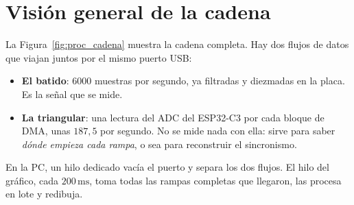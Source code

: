 \section{Visión general de la cadena}
\label{sec:proc_vision}

La Figura~\ref{fig:proc_cadena} muestra la cadena completa. Hay dos flujos
de datos que viajan juntos por el mismo puerto USB:

\begin{itemize}
  \item \textbf{El batido}: $6000$ muestras por segundo, ya filtradas y
    diezmadas en la placa. Es la señal que se mide.
  \item \textbf{La triangular}: una lectura del ADC del ESP32-C3 por cada
    bloque de DMA, unas $187{,}5$ por segundo. No se mide nada con ella:
    sirve para saber \emph{dónde empieza cada rampa}, o sea para reconstruir
    el sincronismo.
\end{itemize}

En la PC, un hilo dedicado vacía el puerto y separa los dos flujos. El hilo
del gráfico, cada $200\,\text{ms}$, toma todas las rampas completas que
llegaron, las procesa en lote y redibuja.

